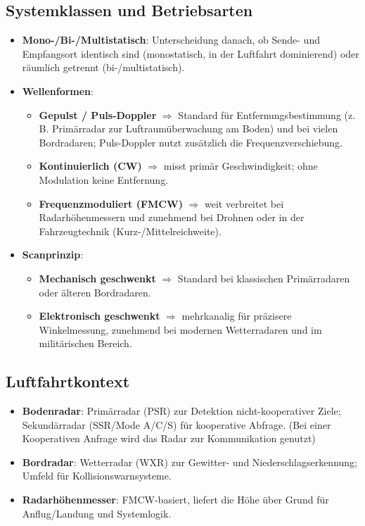 \subsection{Systemklassen und Betriebsarten}
\begin{itemize}
  \item \textbf{Mono-/Bi-/Multistatisch}: Unterscheidung danach, ob Sende- und Empfangsort identisch sind
        (monostatisch, in der Luftfahrt dominierend) oder räumlich getrennt (bi-/multistatisch).
  \item \textbf{Wellenformen}:
    \begin{itemize}
      \item \textbf{Gepulst / Puls-Doppler} $\Rightarrow$ Standard für Entfernungsbestimmung (z.\,B. Primärradar zur Luftraumüberwachung am Boden)
            und bei vielen Bordradaren; Puls-Doppler nutzt zusätzlich die Frequenzverschiebung.
      \item \textbf{Kontinuierlich (CW)} $\Rightarrow$ misst primär Geschwindigkeit; ohne Modulation keine Entfernung.
      \item \textbf{Frequenzmoduliert (FMCW)} $\Rightarrow$ weit verbreitet bei Radarhöhenmessern und zunehmend bei Drohnen
            oder in der Fahrzeugtechnik (Kurz-/Mittelreichweite).
    \end{itemize}
  \item \textbf{Scanprinzip}:
    \begin{itemize}
      \item \textbf{Mechanisch geschwenkt} $\Rightarrow$ Standard bei klassischen Primärradaren oder älteren Bordradaren.
      \item \textbf{Elektronisch geschwenkt} $\Rightarrow$ mehrkanalig für präzisere Winkelmessung,
            zunehmend bei modernen Wetterradaren und im militärischen Bereich.
    \end{itemize}
\end{itemize}

\subsection{Luftfahrtkontext}
\begin{itemize}
  \item \textbf{Bodenradar}: Primärradar (PSR) zur Detektion nicht-kooperativer Ziele;
        Sekundärradar (SSR/Mode A/C/S) für kooperative Abfrage. (Bei einer Kooperativen Anfrage wird das Radar zur Kommunikation genutzt)
  \item \textbf{Bordradar}: Wetterradar (WXR) zur Gewitter- und Niederschlagserkennung; Umfeld für Kollisionswarnsysteme.
  \item \textbf{Radarhöhenmesser}: FMCW-basiert, liefert die Höhe über Grund für Anflug/Landung und Systemlogik.
\end{itemize}

